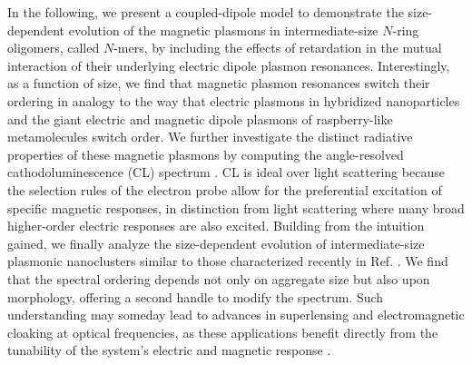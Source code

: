\documentclass [11pt, proquest] {uwthesis}[2016/11/22]
\begin{document}
In the following, we present a coupled-dipole model to demonstrate the size-dependent evolution of the magnetic plasmons in intermediate-size $N$-ring oligomers, called $N$-mers, by including the effects of retardation in the mutual interaction of their underlying electric dipole plasmon resonances. Interestingly, as a function of size, we find that magnetic plasmon resonances switch their ordering in analogy to the way that electric plasmons in hybridized nanoparticles \cite{vonPlessen2007} and the giant electric and magnetic dipole plasmons of raspberry-like metamolecules \cite{Fakhraai2018} switch order. We further investigate the distinct radiative properties of these magnetic plasmons by computing the angle-resolved cathodoluminescence (CL) spectrum \cite{Hohenester2012,Hohenester2014,Coenen2011,CoPol2011,Polman2014}. CL is ideal over light scattering because the selection rules of the electron probe allow for the preferential excitation of specific magnetic responses, in distinction from light scattering where many broad higher-order electric responses are also excited. Building from the intuition gained, we finally analyze the size-dependent evolution of intermediate-size plasmonic nanoclusters similar to those characterized recently in Ref. \cite{Engheta2017}. We find that the spectral ordering depends not only on aggregate size but also upon morphology, offering a second handle to modify the spectrum. Such understanding may someday lead to advances in superlensing and electromagnetic cloaking at optical frequencies, as these applications benefit directly from the tunability of the system's electric and magnetic response \cite{Pendry03,Fang2005,Cai2007,Pinchuk07,Shalaev2008,Valentine2008,Ferrari09,Tian2018}.
\end{document}

